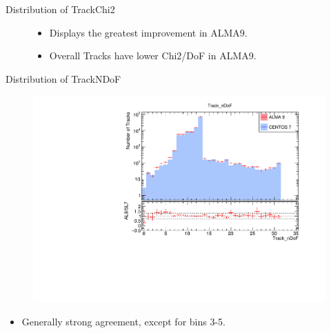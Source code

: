 \begin{frame}{Distribution of TrackChi2}
\begin{figure}
\begin{subfigure}{0.49\linewidth}
        \end{subfigure}
        \begin{itemize}
            \item Displays the greatest improvement in ALMA9.
            \item Overall Tracks have lower Chi2/DoF in ALMA9.
        \end{itemize}
    \end{figure}
\end{frame}



\begin{frame}{Distribution of TrackNDoF}
    \vspace{-0.3cm}
    \begin{figure}
        \includegraphics[width=\linewidth]{./output/Track_nDoF.pdf}
    \end{figure}
    \vspace{-0.65cm}
    \begin{itemize}
        \item Generally strong agreement, except for bins 3-5.
    \end{itemize}
\end{frame}

